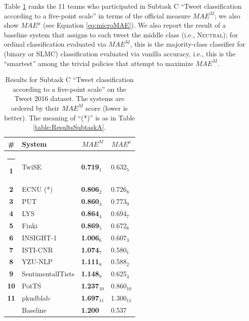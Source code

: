 \documentclass[11pt,letterpaper]{article}
\newif\ifdraft
\newcommand{\fabrizio}[1]{\ifdraft{\textcolor{cyan}{[Fabrizio]: {#1}}}\else{\vspace{0ex}}\fi}
\begin{document}
\noindent Table \ref{table:ResultsSubtaskC} ranks the 11 teams who
participated in Subtask C ``Tweet classification according to a
five-point scale'' in terms of the official measure $MAE^{M}$; we also show $MAE^{\mu}$ (see Equation \ref{eq:microMAE}). We
also report the result of a baseline system that assigns to each tweet
the middle class (i.e., \textsc{Neutral}); for ordinal
classification evaluated via $MAE^M$, this is 
the majority-class classifier for (binary or SLMC) classification
evaluated via vanilla accuracy, i.e., this is
\cite{Baccianella:2009qd} the ``smartest'' among the trivial policies
that attempt to maximize $MAE^M$.

\renewcommand{\baselinestretch}{0.78}
\begin{table}[htb]
  \centering
  \begin{small}
    \renewcommand{\arraystretch}{1.0}%
    \resizebox{\columnwidth}{!} {
    \begin{tabular}{|c|l|l|l|}
      \hline\rule[0ex]{0mm}{2ex} 
      \bf \# & \bf System & \multicolumn{1}{c|}{$MAE^M$} & \multicolumn{1}{c|}{$MAE^{\mu}$} \\
      \hline\rule[0ex]{-1mm}{2ex} 
      \bf 1 & TwiSE & \bf 0.719$_{1}$ & 0.632$_{5}$ \\
      \bf 2 & ECNU (*) & \bf 0.806$_{2}$ & 0.726$_{8}$ \\
      \bf 3 & PUT & \bf 0.860$_{3}$ & 0.773$_{9}$ \\
      \bf 4 & LYS & \bf 0.864$_{4}$ & 0.694$_{7}$ \\
      \bf 5 & Finki & \bf 0.869$_{5}$ & 0.672$_{6}$ \\
      \bf 6 & INSIGHT-1 & \bf 1.006$_{6}$ & 0.607$_{3}$ \\
      \bf 7 & ISTI-CNR & \bf 1.074$_{7}$ & 0.580$_{1}$ \\
      \bf 8 & YZU-NLP & \bf 1.111$_{8}$ & 0.588$_{2}$ \\
      \bf 9 & SentimentalITists & \bf 1.148$_{9}$ & 0.625$_{4}$ \\
      \bf 10 & PotTS & \bf 1.237$_{10}$ & 0.860$_{10}$ \\
      \bf 11 & pkudblab & \bf 1.697$_{11}$ & 1.300$_{11}$ \\
      \hline\rule[0ex]{0mm}{2ex} 
      & Baseline & \bf 1.200 & 0.537\\
      \hline
    \end{tabular}
    } \medskip
 \caption{\label{table:ResultsSubtaskC} Results for Subtask C ``Tweet classification according to a five-point scale'' on the Tweet 2016 dataset. The systems are ordered by their $MAE^{M}$ score (lower is better). The meaning of ``(*)'' is as in Table \ref{table:ResultsSubtaskA}.
 }
\end{small}
\end{table}
\renewcommand{\baselinestretch}{1.00}
\end{document}
